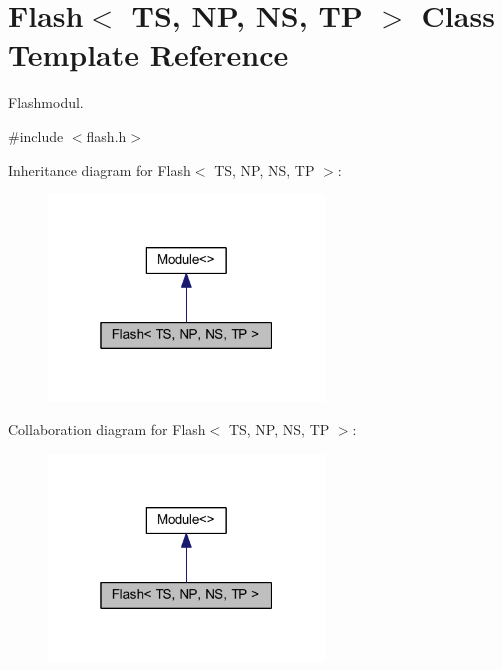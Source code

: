 \hypertarget{class_flash}{}\section{Flash$<$ TS, NP, NS, TP $>$ Class Template Reference}
\label{class_flash}


Flashmodul.  




{\ttfamily \#include $<$flash.\+h$>$}



Inheritance diagram for Flash$<$ TS, NP, NS, TP $>$\+:\nopagebreak
\begin{figure}[H]
\begin{center}
\leavevmode
\includegraphics[width=208pt]{class_flash__inherit__graph}
\end{center}
\end{figure}


Collaboration diagram for Flash$<$ TS, NP, NS, TP $>$\+:\nopagebreak
\begin{figure}[H]
\begin{center}
\leavevmode
\includegraphics[width=208pt]{class_flash__coll__graph}
\end{center}
\end{figure}
